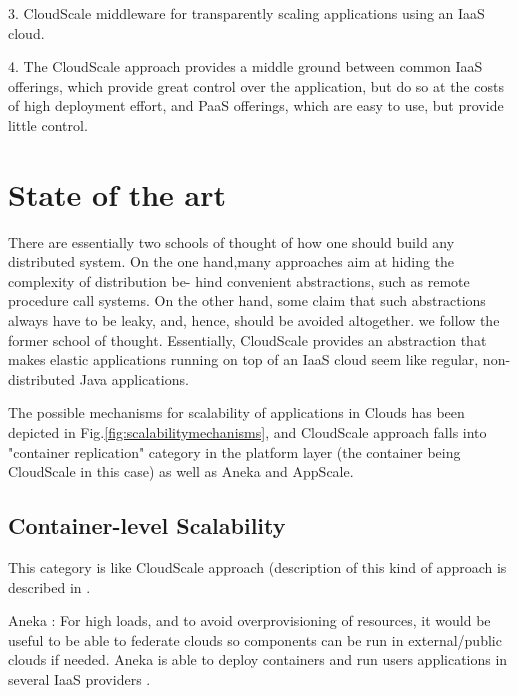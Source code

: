 \documentclass{sig-alternate}
\begin{document}
3. CloudScale middleware for transparently scaling applications using an IaaS cloud.

4. The CloudScale approach provides a middle ground between common IaaS offerings, which provide great control over the application, but do so at the costs of high deployment effort, and PaaS offerings, which are easy to use, but provide little control. ~\cite{leitner2012cloudscale}



\section{State of the art}


There are essentially two schools of thought of how one should build any distributed system. On the one hand,many approaches aim at hiding the complexity of distribution be- hind convenient abstractions, such as remote procedure call systems. On the other hand, some claim that such abstractions always have to be leaky, and, hence, should be avoided altogether. we follow the former school of thought. Essentially, CloudScale provides an abstraction that makes elastic applications running on top of an IaaS cloud seem like regular, non-distributed Java applications.

The possible mechanisms for scalability of applications in Clouds has been depicted in Fig.\ref{fig:scalabilitymechanisms}, and CloudScale approach falls into "container replication" category in the platform layer (the container being CloudScale in this case) as well as Aneka and AppScale.

\begin{figure*}
\centering
{}
\caption{Available Mechanisms for Holistic Application Scalability ~\cite{vaquero2011dynamically}}
\label{fig:scalabilitymechanisms}
\end{figure*}

\subsection{Container-level Scalability}
This category is like CloudScale approach (description of this kind of approach is described in \cite{vaquero2011dynamically}.

Aneka \cite{vecchiola2009aneka}: For high loads, and to avoid overprovisioning of resources, it would be useful to be able to federate clouds so components can be run in external/public clouds if needed. Aneka is able to deploy containers and run users applications in several IaaS providers \cite{vaquero2011dynamically}. 
\end{document}
